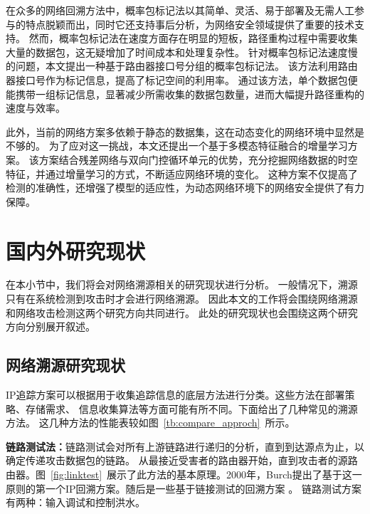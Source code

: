 在众多的网络回溯方法中，概率包标记法以其简单、灵活、易于部署及无需人工参与的特点脱颖而出，同时它还支持事后分析，为网络安全领域提供了重要的技术支持。
然而，概率包标记法在速度方面存在明显的短板，路径重构过程中需要收集大量的数据包，这无疑增加了时间成本和处理复杂性。
针对概率包标记法速度慢的问题，本文提出一种基于路由器接口号分组的概率包标记法。
该方法利用路由器接口号作为标记信息，提高了标记空间的利用率。
通过该方法，单个数据包便能携带一组标记信息，显著减少所需收集的数据包数量，进而大幅提升路径重构的速度与效率。\par

此外，当前的网络方案多依赖于静态的数据集，这在动态变化的网络环境中显然是不够的。
为了应对这一挑战，本文还提出一个基于多模态特征融合的增量学习方案。
该方案结合残差网络与双向门控循环单元的优势，充分挖掘网络数据的时空特征，并通过增量学习的方式，不断适应网络环境的变化。
这种方案不仅提高了检测的准确性，还增强了模型的适应性，为动态网络环境下的网络安全提供了有力保障。\par



\section{国内外研究现状}
在本小节中，我们将会对网络溯源相关的研究现状进行分析。
一般情况下，溯源只有在系统检测到攻击时才会进行网络溯源。
因此本文的工作将会围绕网络溯源和网络攻击检测这两个研究方向共同进行。
此处的研究现状也会围绕这两个研究方向分别展开叙述。

\subsection{网络溯源研究现状}
IP追踪方案可以根据用于收集追踪信息的底层方法进行分类。这些方法在部署策略、存储需求、
信息收集算法等方面可能有所不同。下面给出了几种常见的溯源方法\cite{singh2016}。
这几种方法的性能表较如图~\ref{tb:compare_approch}~所示。

\textbf{链路测试法：}链路测试会对所有上游链路进行递归的分析，直到到达源点为止，以确定传递攻击数据包的链路。
从最接近受害者的路由器开始，直到攻击者的源路由器。图~\ref{fig:linktest}~展示了此方法的基本原理。2000年，Burch提出了基于这一
原则的第一个IP回溯方案\cite{Burch2000Tracing}。随后是一些基于链接测试的回溯方案
\cite{HamediHamzehkolaie2012DOSTraceback,ShiYang2005DDoSDefense,
ThingSlomanDulay2008DDoSDetection}。
链路测试方案有两种：输入调试和控制洪水。


